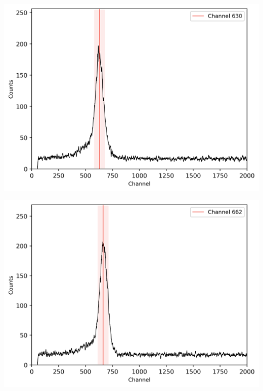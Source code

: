 \begin{center}
    \begin{adjustbox}{max width=\linewidth, keepaspectratio}
        \includegraphics[]{png/137CsTPHC}
    \end{adjustbox}
    \label{fig:}
\end{center}
%
\begin{center}
    \begin{adjustbox}{max width=\linewidth, keepaspectratio}
        \includegraphics[]{png/137CsTPHC20ns}
    \end{adjustbox}
    \label{fig:}
\end{center}
%
